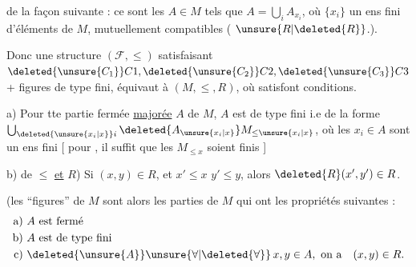 de la façon suivante : ce sont les $A\in M$ tels que $A=\bigcup_i A_{x_i}$, où  $\{x_i\}$  un ens fini d'éléments de $M$, mutuellement compatibles ( $\unsure{R|\deleted{R}}$.).

Donc une structure $(\mathcal F,\leq)$ satisfaisant $\deleted{\unsure{C_1}}C1,\deleted{\unsure{C_2}}C2,\deleted{\unsure{C_3}}C3$ + figures  de type fini, équivaut à $(M,\leq,R)$, où   satisfont  conditions.

a)  Pour tte partie fermée \uline{majorée} $A$\deleted{\unsure{,}} de $M$, $A$ est de type fini i.e de la forme $\bigcup_{\deleted{\unsure{x_i|x}}i}\deleted{A_{\unsure{x_i|x}}}M_{\leq\unsure{x_i|x}}$, où les $x_i\in A$  sont un ens fini [ pour , il suffit que les $M_{\leq x}$ soient finis ]


b)  de $\leq$ \uline{et} $R$) Si $(x,y)\in R$, et $x'\leq x$ $y'\leq y$, alors $\deleted{R}(x',y')\in R$.


(les ``figures'' de $M$ sont alors les parties  de $M$ qui ont les propriétés suivantes :
\[
\begin{aligned}
\text{a) } & A\text{ est fermé}\\
\text{b) } & A\text{ est de type fini}\\
\text{c) } & \deleted{\unsure{A}}\unsure{\forall|\deleted{\forall}}\,x,y\in A,\ \text{on a}\quad (x,y)\in R.
\end{aligned}
\]
